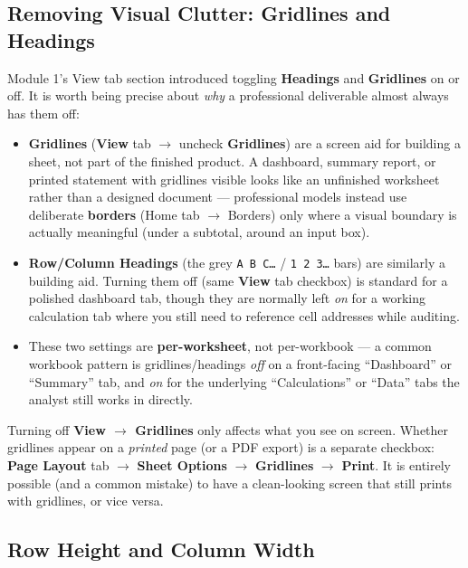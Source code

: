\documentclass[11pt,a4paper]{article}
\begin{document}
\subsection{Removing Visual Clutter: Gridlines and Headings}

Module 1's View tab section introduced toggling \textbf{Headings} and \textbf{Gridlines} on or off. It is worth being precise about \emph{why} a professional deliverable almost always has them off:

\begin{itemize}
  \item \textbf{Gridlines} (\textbf{View} tab $\rightarrow$ uncheck \textbf{Gridlines}) are a screen aid for building a sheet, not part of the finished product. A dashboard, summary report, or printed statement with gridlines visible looks like an unfinished worksheet rather than a designed document --- professional models instead use deliberate \textbf{borders} (Home tab $\rightarrow$ Borders) only where a visual boundary is actually meaningful (under a subtotal, around an input box).
  \item \textbf{Row/Column Headings} (the grey \texttt{A B C\ldots} / \texttt{1 2 3\ldots} bars) are similarly a building aid. Turning them off (same \textbf{View} tab checkbox) is standard for a polished dashboard tab, though they are normally left \emph{on} for a working calculation tab where you still need to reference cell addresses while auditing.
  \item These two settings are \textbf{per-worksheet}, not per-workbook --- a common workbook pattern is gridlines/headings \emph{off} on a front-facing ``Dashboard'' or ``Summary'' tab, and \emph{on} for the underlying ``Calculations'' or ``Data'' tabs the analyst still works in directly.
\end{itemize}

\begin{pitfall}
Turning off \textbf{View $\rightarrow$ Gridlines} only affects what you see on screen. Whether gridlines appear on a \emph{printed} page (or a PDF export) is a separate checkbox: \textbf{Page Layout} tab $\rightarrow$ \textbf{Sheet Options} $\rightarrow$ \textbf{Gridlines} $\rightarrow$ \textbf{Print}. It is entirely possible (and a common mistake) to have a clean-looking screen that still prints with gridlines, or vice versa.
\end{pitfall}

\subsection{Row Height and Column Width}
\end{document}
